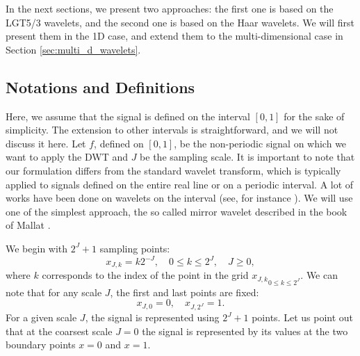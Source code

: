 In the next sections, we present two approaches: the first one is based on the LGT5/3 wavelets, and the second one is based on the Haar wavelets.
We will first present them in the 1D case, and extend them to the multi-dimensional case in Section \ref{sec:multi_d_wavelets}.

\subsection{Notations and Definitions} \label{sec:notations}

Here, we assume that the signal is defined on the interval $[0,1]$ for the sake of simplicity.
The extension to other intervals is straightforward, and we will not discuss it here.
Let $f$, defined on $[0,1]$, be the non-periodic signal on which we want to apply the DWT and $J$ be the sampling scale.
It is important to note that our formulation differs from the standard wavelet transform, which is typically applied to signals defined on the entire real line or on a periodic interval. A lot of works have been done on wavelets on the interval (see, for instance \cite{cohen1993wavelets,dahmen1999biorthogonal, auscher1992wavelets, bertoluzza2017new}). We will use one of the simplest approach, the so called mirror wavelet described in the book of Mallat \cite{mallat1999wavelet}.

We begin with $2^J+1$ sampling points:
\begin{equation}
\label{eq:sampling_points_power_of_2_plus_1}
x_{J,k}=k2^{-J},\quad0\leq k\leq2^{J},\quad J\geq0,
\end{equation}
where $k$ corresponds to the index of the point in the grid ${x_{J,k}}_{0\leq k\leq2^{J}}$.
We can note that for any scale $J$, the first and last points are fixed:
\begin{equation}
x_{J,0}=0,\quad x_{J,2^{J}}=1.
\end{equation}
For a given scale \( J \), the signal is represented using \( 2^J + 1 \) points.
Let us point out that at the coarsest scale $J=0$ the signal is represented by its values at the two boundary points $x=0$ and $x=1$.

